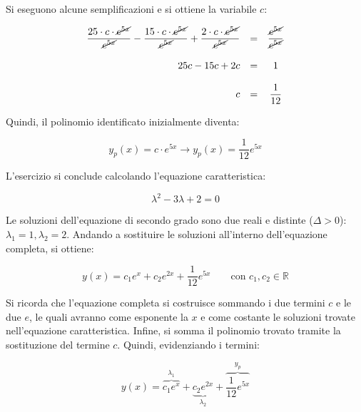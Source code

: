 \documentclass[a4paper]{article}
\begin{document}
	\noindent
	Si eseguono alcune semplificazioni e si ottiene la variabile $c$:
	
	\begin{equation*}
		\begin{array}{rcc}
			\dfrac{25 \cdot c \cdot \cancel{e^{5x}}}{\cancel{e^{5x}}} - \dfrac{15 \cdot c \cdot \cancel{e^{5x}}}{\cancel{e^{5x}}} + \dfrac{2 \cdot c \cdot \cancel{e^{5x}}}{\cancel{e^{5x}}} & = & \dfrac{\cancel{e^{5x}}}{\cancel{e^{5x}}} \\
			&& \\
			25c - 15c + 2c & = & 1 \\
			&& \\
			c & = & \dfrac{1}{12}
		\end{array}
	\end{equation*}

	\noindent
	Quindi, il polinomio identificato inizialmente diventa:
	
	\begin{equation*}
		y_{p}\left(x\right) = c \cdot e^{5x} \longrightarrow y_{p}\left(x\right) = \dfrac{1}{12} e^{5x}
	\end{equation*}

	\noindent
	L'esercizio si conclude calcolando l'equazione caratteristica:
	
	\begin{equation*}
		\lambda^{2} - 3\lambda + 2 = 0
	\end{equation*}

	\noindent
	Le soluzioni dell'equazione di secondo grado sono due reali e distinte ($\Delta > 0$): $\lambda_{1} = 1, \lambda_{2} = 2$. Andando a sostituire le soluzioni all'interno dell'equazione completa, si ottiene:
	
	\begin{equation*}
		y\left(x\right) = c_{1}e^{x} + c_{2}e^{2x} + \dfrac{1}{12} e^{5x} \hspace{2em} \text{con } c_{1}, c_{2} \in \mathbb{R}
	\end{equation*}

	\noindent
	Si ricorda che l'equazione completa si costruisce sommando i due termini $c$ e le due $e$, le quali avranno come esponente la $x$ e come costante le soluzioni trovate nell'equazione caratteristica. Infine, si somma il polinomio trovato tramite la sostituzione del termine $c$. Quindi, evidenziando i termini:
	
	\begin{equation*}
		y\left(x\right) = \overbrace{c_{1}e^{x}}^{\lambda_{1}} + \underbrace{c_{2}e^{2x}}_{\lambda_{2}} + \overbrace{\dfrac{1}{12} e^{5x}}^{y_{p}}
	\end{equation*}
\end{document}
